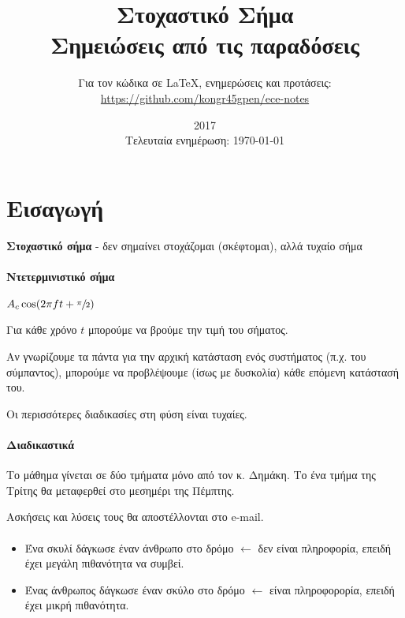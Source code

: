 \documentclass[11pt,a4paper,notitlepage,fleqn,final]{article}
\title{Στοχαστικό Σήμα
	\\
	{
	\normalsize Σημειώσεις από τις παραδόσεις
	}}
\date{2017
	\\
	{
	\small Τελευταία ενημέρωση: \today
	}
	}
\author{
	Για τον κώδικα σε \LaTeX, ενημερώσεις και προτάσεις:
\\
 \url{https://github.com/kongr45gpen/ece-notes}}
\begin{document}
	\maketitle

	\tableofcontents

	\newpage

	\setcounter{section}{-1}
	\section{Εισαγωγή}

    \textbf{Στοχαστικό σήμα} - δεν σημαίνει στοχάζομαι
    (σκέφτομαι), αλλά
    τυχαίο σήμα

    \paragraph{Ντετερμινιστικό σήμα}
    \( A_c\cos(2\pi f t + \sfrac{\pi}{2}) \)


    Για κάθε χρόνο \(t\) μπορούμε να βρούμε την τιμή του
    σήματος.

    Αν γνωρίζουμε τα πάντα για
    την αρχική κατάσταση ενός συστήματος
    (π.χ. του σύμπαντος), μπορούμε να προβλέψουμε
    (ίσως με δυσκολία) κάθε επόμενη κατάστασή του.

    Οι περισσότερες διαδικασίες στη φύση είναι τυχαίες.

    \paragraph{Διαδικαστικά}
    Το μάθημα γίνεται σε δύο τμήματα μόνο από τον κ. Δημάκη. Το
    ένα τμήμα της Τρίτης θα μεταφερθεί στο μεσημέρι της Πέμπτης.

    Ασκήσεις και λύσεις τους θα αποστέλλονται στο e-mail.

    \paragraph{}
    \begin{itemize}
    	\item Ένα σκυλί δάγκωσε έναν άνθρωπο στο δρόμο
    	\( \leftarrow \) δεν είναι πληροφορία, επειδή έχει
    	μεγάλη πιθανότητα να συμβεί.
    	\item Ένας άνθρωπος δάγκωσε έναν σκύλο στο δρόμο
    	\( \leftarrow \) είναι πληροφορορία, επειδή έχει μικρή
    	πιθανότητα.
    \end{itemize}
\end{document}
